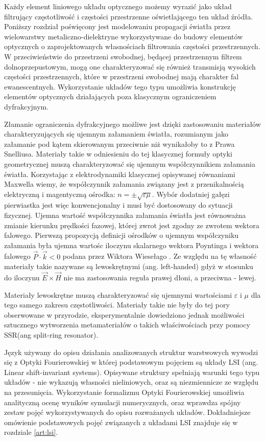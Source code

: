 Każdy element liniowego układu optycznego możemy wyrazić jako układ filtrujący częstotliwość i częstości przestrzenne oświetlającego ten układ źródła. Poniższy rozdział poświęcony jest modelowaniu propagacji światła przez wielowarstwy metaliczno-dielektryne wykorzystywane do  budowy elementów optycznych o zaprojektowanych własnościach filtrowania częstości przestrzennych. W przeciwieństwie do przestrzeni swobodnej, będącej przestrzennym filtrem dolnoprzepustowym, mogą one charakteryzować się również transmisją wysokich częstości przestrzennych, które w przestrzeni swobodnej mają charakter fal ewanescentnych. Wykorzystanie układów tego typu umożliwia konstrukcję elementów optycznych działających poza klasycznym ograniczeniem dyfrakcyjnym.

Złamanie ograniczenia dyfrakcyjnego możliwe jest dzięki zastosowaniu materiałów charakteryzujących się ujemnym załamaniem światła, rozumianym jako załamanie pod kątem skierowanym przeciwnie niż wynikałoby to z Prawa Snelliusa. Materiały takie w odniesieniu do tej klasycznej formuły optyki geometrycznej muszą charakteryzować się ujemnym współczynnikiem załamania światła. Korzystając z elektrodynamiki klasycznej opisywanej równaniami Maxwella wiemy, że współczynnik załamania związany jest z przenikalnością elektryczną i magentyczną ośrodka: $n = \pm \sqrt{ \varepsilon \mu}$. Wybór dodatniej gałęzi pierwiastka jest więc konwencjonalny i musi być dostosowany do sytuacji fizycznej. Ujemna wartość współczynnika załamania światła jest równoważna zmianie kierunku prędkości fazowej, której zwrot jest zgodny ze zwrotem wektora falowego. Pierwszą propozycją definicji ośrodków o ujemnym współczyniku załamania była ujemna wartośc iloczynu skalarnego wektora Poyntinga i wektora falowego $\vec{P} \cdot \vec{k} < 0$ podana przez Wiktora Wiesełago \cite{veselago1968electrodynamics}. Ze względu na tę własność materiały takie nazywane są lewoskrętnymi (ang. left-handed) gdyż w stosunku do iloczynu $\vec{E} \times \vec{H}$ nie ma zastosowania reguła prawej dłoni, a przeciwna - lewej.

Materiały lewoskrętne muszą charakteryzować się ujemnymi wartościami $\varepsilon$ i $\mu$ dla tego samego zakresu częstotliwości. Materiały takie nie były do tej pory obserwowane w przyrodzie, eksperymentalnie dowiedziono jednak możliwości sztucznego wytworzenia metamateriałów o takich właściwościach\cite{PhysRevLett.84.4184} przy pomocy SSR(ang split-ring resonator). 

Język używany do opisu działania analizowanych struktur warstwowych wywodzi się z Optyki Fourierowskiej w której podstawowym pojęciem są układy LSI (ang. Linear shift-invariant systems). Opisywane struktury spełniają warunki tego typu układów - nie wykazują własności nieliniowych, oraz są niezmiennicze ze względu na przesunięcia. Wykorzystanie formalizmu Optyki Fourierowskiej umożliwia analityczną ocenę wyników symulacji numerycznych, oraz wprawdza spójny zestaw pojęć wykorzystywanych do opisu rozważanych układów. Dokładniejsze omówienie podstawowych pojęć związanych z układami LSI znajduje się w rozdziale \ref{art:lsi}.


